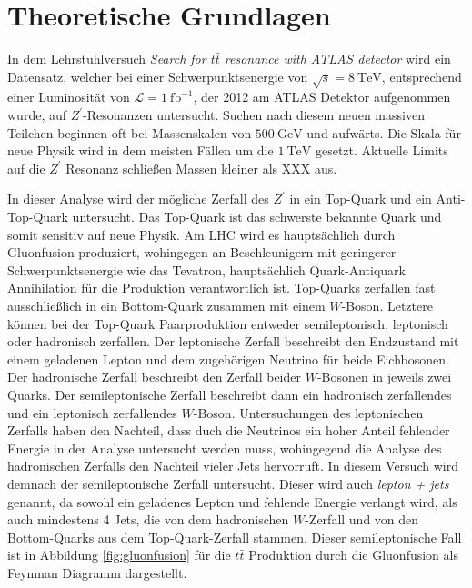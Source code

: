 \section{Theoretische Grundlagen}

In dem Lehrstuhlversuch \textit{Search for $t\bar{t}$ resonance with ATLAS detector} wird ein Datensatz, welcher bei
einer Schwerpunktsenergie von $\sqrt{s} = \SI{8}{\tera\electronvolt}$, entsprechend einer Luminosität von
$\mathcal{L} = \SI{1}{\femto\barn}^{-1}$, der 2012 am ATLAS Detektor aufgenommen wurde, auf $Z^\prime$-Resonanzen untersucht.
Suchen nach diesem neuen massiven Teilchen beginnen oft bei Massenskalen von $\SI{500}{\giga\electronvolt}$ und aufwärts. Die
Skala für neue Physik wird in dem meisten Fällen um die $\SI{1}{\tera\electronvolt}$ gesetzt. Aktuelle Limits auf die
$Z^\prime$ Resonanz schließen Massen kleiner als XXX aus. \par

In dieser Analyse wird der mögliche Zerfall des $Z^\prime$ in ein Top-Quark und ein Anti-Top-Quark untersucht. Das Top-Quark
ist das schwerste bekannte Quark und somit sensitiv auf neue Physik. Am LHC wird es hauptsächlich durch Gluonfusion
produziert, wohingegen an Beschleunigern mit geringerer Schwerpunktsenergie wie das Tevatron, hauptsächlich Quark-Antiquark
Annihilation für die Produktion verantwortlich ist. Top-Quarks
zerfallen fast ausschließlich in ein Bottom-Quark zusammen mit einem $W$-Boson. Letztere können bei der
Top-Quark Paarproduktion entweder semileptonisch,
leptonisch oder hadronisch zerfallen. Der leptonische Zerfall beschreibt den Endzustand mit einem geladenen Lepton und
dem zugehörigen Neutrino für beide Eichbosonen. Der hadronische Zerfall beschreibt den Zerfall beider $W$-Bosonen in
jeweils zwei Quarks. Der semileptonische Zerfall beschreibt dann ein hadronisch zerfallendes und ein leptonisch
zerfallendes  $W$-Boson. Untersuchungen des leptonischen Zerfalls haben den Nachteil, dass duch die Neutrinos ein hoher Anteil fehlender
Energie in der Analyse untersucht werden muss, wohingegend die Analyse des hadronischen Zerfalls den Nachteil vieler Jets
hervorruft.
In diesem Versuch wird demnach der semileptonische Zerfall untersucht.
Dieser wird auch \textit{lepton + jets} genannt,
da sowohl ein geladenes Lepton und fehlende Energie verlangt wird, als auch mindestens 4 Jets, die von dem hadronischen $W$-Zerfall und von den Bottom-Quarks
aus dem Top-Quark-Zerfall stammen.
Dieser semileptonische Fall ist in Abbildung \ref{fig:gluonfusion} für die $t\bar{t}$ Produktion durch die Gluonfusion als Feynman Diagramm dargestellt.  \par

